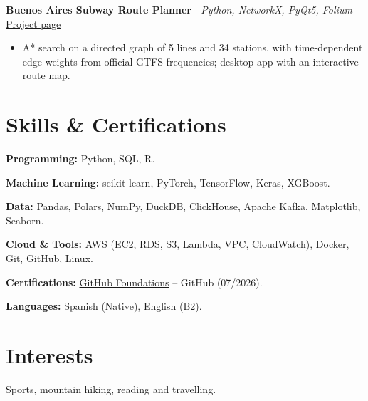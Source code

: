 \documentclass[10pt,a4paper]{article}
\begin{document}
\vspace{3pt}

\noindent
\textbf{Buenos Aires Subway Route Planner} $\vert$ \textit{\small Python, NetworkX, PyQt5, Folium} \hfill \href{https://rodrigopintoaguilera.github.io/subte-router/}{\small Project page}
\begin{itemize}
    \item A* search on a directed graph of 5 lines and 34 stations, with time-dependent edge weights from official GTFS frequencies; desktop app with an interactive route map.
\end{itemize}

\section{Skills \& Certifications}

\noindent
\textbf{Programming:} Python, SQL, R.

\vspace{3pt}

\noindent
\textbf{Machine Learning:} scikit-learn, PyTorch, TensorFlow, Keras, XGBoost.

\vspace{3pt}

\noindent
\textbf{Data:} Pandas, Polars, NumPy, DuckDB, ClickHouse, Apache Kafka, Matplotlib, Seaborn.

\vspace{3pt}

\noindent
\textbf{Cloud \& Tools:} AWS (EC2, RDS, S3, Lambda, VPC, CloudWatch), Docker, Git, GitHub, Linux.

\vspace{3pt}

\noindent
\textbf{Certifications:} \href{https://learn.microsoft.com/api/credentials/share/en-us/RODRIGOPINTOAGUILERA-7415/292C69A45AF1BC46?sharingId=844F4893231F1CFE}{GitHub Foundations} -- GitHub (07/2026).

\vspace{3pt}

\noindent
\textbf{Languages:} Spanish (Native), English (B2).

\section{Interests}

\noindent
Sports, mountain hiking, reading and travelling.
\end{document}
